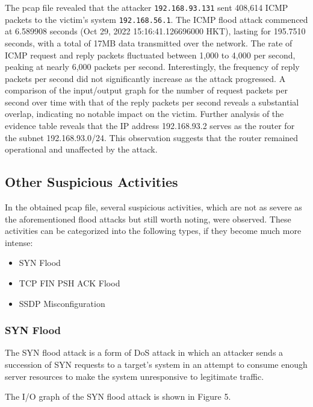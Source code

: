\documentclass{article}
\begin{document}
    The pcap file revealed that the attacker \lstinline|192.168.93.131| sent 408,614 ICMP packets to the victim's system \lstinline|192.168.56.1|.
    The ICMP flood attack commenced at 6.589908 seconds (Oct 29, 2022 15:16:41.126696000 HKT), lasting for 195.7510 seconds, with a total of 17MB data transmitted over the network. 
    The rate of ICMP request and reply packets fluctuated between 1,000 to 4,000 per second, peaking at nearly 6,000 packets per second.
    Interestingly, the frequency of reply packets per second did not significantly increase as the attack progressed. 
    A comparison of the input/output graph for the number of request packets per second over time with that of the reply packets per second reveals a substantial overlap, indicating no notable impact on the victim.
    Further analysis of the evidence table reveals that the IP address 192.168.93.2 serves as the router for the subnet 192.168.93.0/24. 
    This observation suggests that the router remained operational and unaffected by the attack.

    \subsection{\fontsize{14pt}{17pt}\selectfont Other Suspicious Activities}\label{subsec:other-suspicious-activities}
    In the obtained pcap file, several suspicious activities, 
    which are not as severe as the aforementioned flood attacks but still worth noting, were observed.
    These activities can be categorized into the following types, if they become much more intense:

    \begin{itemize}
        \item SYN Flood
        \item TCP FIN PSH ACK Flood
        \item SSDP Misconfiguration
    \end{itemize}

    \subsubsection{SYN Flood}\label{subsubsec:syn-flood}
    The SYN flood attack is a form of DoS attack in which an attacker sends a succession of SYN requests to a target's system in an attempt to consume enough server resources to make the system unresponsive to legitimate traffic.

    The I/O graph of the SYN flood attack is shown in Figure 5.
\end{document}
